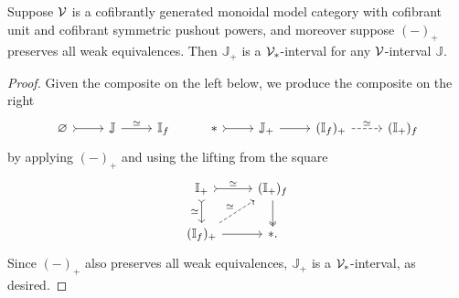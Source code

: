 \documentclass[a4paper,10pt
,draft
]{article}%
\newcommand{\I}{\mathbb I}
\newcommand{\J}{\mathbb J}
\renewcommand{\1}{\eta}%
\begin{document}
\begin{proposition}
      \label{VPT_INT_PROP}
      Suppose $\mathcal V$ is a cofibrantly generated monoidal model category with cofibrant unit and cofibrant symmetric pushout powers,
      and moreover suppose $(-)_+$ preserves all weak equivalences.
      Then $\J_+$ is a $\V_{\**}$-interval for any $\mathcal V$-interval $\J$.
\end{proposition}
\begin{proof}
      Given the composite on the left below, we produce the composite on the right
      \begin{equation}
            \begin{tikzcd}
                  \varnothing \arrow[r, rightarrowtail]
                  &
                  \J \arrow[r, "\simeq"]
                  &
                  \I_f
                  & %
                  \** \arrow[r, rightarrowtail]
                  &
                  \J_+ \arrow[r]
                  &
                  (\I_f)_+ \arrow[r, dashed, "\simeq"]
                  &
                  (\I_+)_f
            \end{tikzcd}
      \end{equation}
      by applying $(-)_+$ and using the lifting from the square
      \begin{equation}
            \label{IFP_IPF_EQ}
            \begin{tikzcd}
                  \I_+ \arrow[d, rightarrowtail, "\simeq"'] \arrow[r, rightarrowtail, "\simeq"]
                  &
                  (\I_+)_f \arrow[d, twoheadrightarrow]
                  \\
                  (\I_f)_+ \arrow[ur, dashed, "\simeq"] \arrow[r]
                  &
                  \**.
            \end{tikzcd}
      \end{equation}
      Since $(-)_+$ also preserves all weak equivalences, $\J_+$ is a $\V_{\**}$-interval, as desired.
\end{proof}
\end{document}
